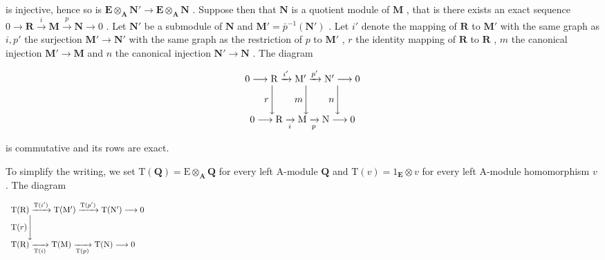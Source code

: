 is injective, hence so is \(\mathbf{E} \otimes_{\mathbf{A}} \mathbf{N}' \to \mathbf{E} \otimes_{\mathbf{A}} \mathbf{N}\) . Suppose then that \(\mathbf{N}\) is a quotient module of \(\mathbf{M}\) , that is there exists an exact sequence \(0 \to \mathbf{R} \xrightarrow{i} \mathbf{M} \xrightarrow{p} \mathbf{N} \to 0\) . Let \(\mathbf{N}'\) be a submodule of \(\mathbf{N}\) and \(\mathbf{M}' = \bar{p}^{-1}(\mathbf{N}')\) . Let \(i'\) denote the mapping of \(\mathbf{R}\) to \(\mathbf{M}'\) with the same graph as \(i, p'\) the surjection \(\mathbf{M}' \to \mathbf{N}'\) with the same graph as the restriction of \(p\) to \(\mathbf{M}'\) , \(r\) the identity mapping of \(\mathbf{R}\) to \(\mathbf{R}\) , \(m\) the canonical injection \(\mathbf{M}' \to \mathbf{M}\) and \(n\) the canonical injection \(\mathbf{N}' \to \mathbf{N}\) . The diagram

\[
\begin{array}{c} 0 \longrightarrow \mathrm{R} \xrightarrow {i ^ {\prime}} \mathrm{M} ^ {\prime} \xrightarrow {p ^ {\prime}} \mathrm{N} ^ {\prime} \longrightarrow 0 \\ r \Biggl \downarrow \qquad m \Biggl \downarrow \qquad n \Biggl \downarrow \\ 0 \longrightarrow \mathrm{R} \xrightarrow [ i ]{} \mathrm{M} \xrightarrow [ p ]{} \mathrm{N} \longrightarrow 0 \end{array}
\]

is commutative and its rows are exact.

To simplify the writing, we set \(\mathrm{T}(\mathbf{Q}) = \mathrm{E} \otimes_{\mathbf{A}} \mathbf{Q}\) for every left A-module \(\mathbf{Q}\) and \(\mathrm{T}(v) = 1_{\mathbf{E}} \otimes v\) for every left A-module homomorphism \(v\) . The diagram

\[
\begin{array}{l} \mathrm{T} (\mathrm{R}) \xrightarrow {\mathrm{T} (i ^ {\prime})} \mathrm{T} (\mathrm{M} ^ {\prime}) \xrightarrow {\mathrm{T} (p ^ {\prime})} \mathrm{T} (\mathrm{N} ^ {\prime}) \longrightarrow 0 \\ \mathrm{T} (r) \Bigg \downarrow \qquad \qquad \qquad \qquad \qquad \qquad \qquad \qquad \qquad \qquad \qquad \qquad \qquad \qquad \qquad \qquad \qquad \qquad \qquad \qquad \qquad \qquad \qquad \qquad \qquad \qquad \qquad \qquad \qquad \qquad \qquad \qquad \qquad \qquad \\ \mathrm{T} (\mathrm{R}) \xrightarrow [ \mathrm{T} (i) ]{} \mathrm{T} (\mathrm{M}) \xrightarrow [ \mathrm{T} (p) ]{} \mathrm{T} (\mathrm{N}) \longrightarrow 0 \end{array}
\]

